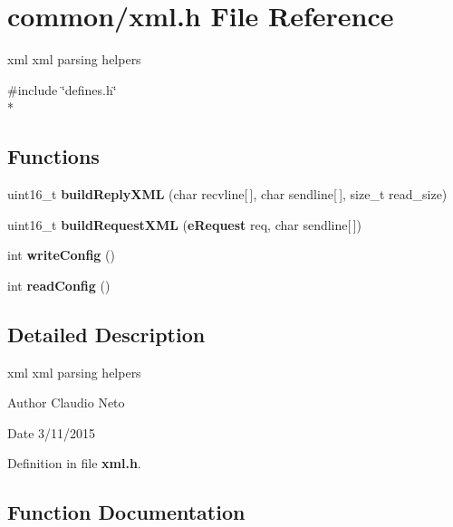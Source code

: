 \section{common/xml.h File Reference}
\label{xml_8h}


xml xml parsing helpers  


{\ttfamily \#include \char`\"{}defines.\-h\char`\"{}}\\*
\subsection*{Functions}
\begin{DoxyCompactItemize}
\item 
uint16\-\_\-t {\bf build\-Reply\-X\-M\-L} (char recvline[$\,$], char sendline[$\,$], size\-\_\-t read\-\_\-size)
\item 
uint16\-\_\-t {\bf build\-Request\-X\-M\-L} ({\bf e\-Request} req, char sendline[$\,$])
\item 
int {\bf write\-Config} ()
\item 
int {\bf read\-Config} ()
\end{DoxyCompactItemize}


\subsection{Detailed Description}
xml xml parsing helpers \begin{DoxyAuthor}{Author}
Claudio Neto
\end{DoxyAuthor}
\begin{DoxyDate}{Date}
3/11/2015 
\end{DoxyDate}


Definition in file {\bf xml.\-h}.



\subsection{Function Documentation}
